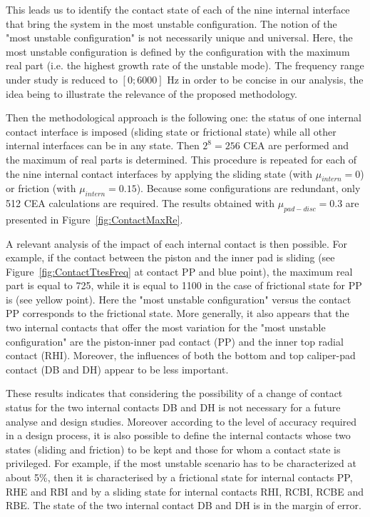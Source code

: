 \documentclass[final,1p]{elsarticle}
\begin{document}
This leads us to identify the contact state of each of the nine internal interface that bring the system in the most unstable configuration. The notion of the "most unstable configuration" is not necessarily unique and universal. Here, the most unstable configuration is defined by the configuration with the maximum real part (i.e. the highest growth rate of the unstable mode). The frequency range under study is reduced to $[0;6000]$ Hz in order to be concise in our analysis, the idea being to illustrate the relevance of the proposed methodology. 

Then the methodological approach is the following one: the status of one internal contact interface is imposed (sliding state or frictional state) while all other internal interfaces can be in any state. Then $2^8=256$ CEA are performed and the maximum of real parts is determined. This procedure is repeated for each of the nine internal contact interfaces by applying the sliding state (with $\mu_{intern} =0$) or friction (with $\mu_{intern} = 0.15$). Because some configurations are redundant, only 512 CEA calculations are required. The results obtained with $\mu_{pad-disc}=0.3$ are presented in Figure~\ref{fig:ContactMaxRe}.

A relevant analysis of the impact of each internal contact is then possible. For example, if the contact between the piston and the inner pad is sliding (see Figure~\ref{fig:ContactTtesFreq} at contact PP and blue point), the maximum real part is equal to 725, while it is equal to 1100 in the case of frictional state for PP is (see yellow point). Here the "most unstable configuration" versus the contact PP corresponds to the frictional state. More generally, it also appears that the two internal contacts that offer the most variation for the "most unstable configuration" are  the piston-inner pad contact (PP) and the inner top radial contact (RHI). Moreover, the  influences of both the bottom and top caliper-pad contact (DB and DH) appear to be less important. 

These results indicates that considering the possibility of a change of contact status for the two internal contacts DB and DH is not necessary for a future analyse and design studies. Moreover according to  the level of accuracy required in a design process, it is also possible to define the internal contacts whose two states (sliding and friction) to be kept and those for whom a contact state is privileged. For example, if the most unstable scenario has to be characterized at about 5\%, then it is characterised by a frictional state for internal contacts PP, RHE and RBI and by a sliding state for internal contacts RHI, RCBI, RCBE and RBE. The state of the two internal contact DB and DH is in the margin of error. 
\end{document}
